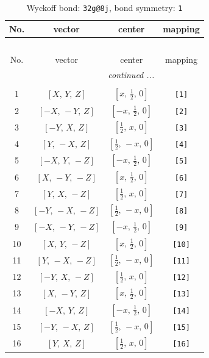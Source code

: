 \documentclass[fleqn,8pt]{jsarticle}
\begin{document}
\begin{longtable}{cccc}
\caption{Wyckoff bond: {\tt 32g@8j}, bond symmetry: {\tt 1}}
 \\
 \hline \hline
No. & vector & center & mapping \\ \hline \endfirsthead

\multicolumn{3}{l}{\tablename\ \thetable{}} \\
 \hline \hline
No. & vector & center & mapping \\ \hline \endhead

 \hline \hline
\multicolumn{3}{r}{\footnotesize\it continued ...} \\ \endfoot

 \hline \hline
\multicolumn{3}{r}{} \\ \endlastfoot

1 & $\left[ X,\, Y,\, Z \right]$ & $\left[ x,\, \frac{1}{2},\, 0 \right]$ & {\tt [1]} \\ \hline
2 & $\left[ - X,\, - Y,\, Z \right]$ & $\left[ - x,\, \frac{1}{2},\, 0 \right]$ & {\tt [2]} \\ \hline
3 & $\left[ - Y,\, X,\, Z \right]$ & $\left[ \frac{1}{2},\, x,\, 0 \right]$ & {\tt [3]} \\ \hline
4 & $\left[ Y,\, - X,\, Z \right]$ & $\left[ \frac{1}{2},\, - x,\, 0 \right]$ & {\tt [4]} \\ \hline
5 & $\left[ - X,\, Y,\, - Z \right]$ & $\left[ - x,\, \frac{1}{2},\, 0 \right]$ & {\tt [5]} \\ \hline
6 & $\left[ X,\, - Y,\, - Z \right]$ & $\left[ x,\, \frac{1}{2},\, 0 \right]$ & {\tt [6]} \\ \hline
7 & $\left[ Y,\, X,\, - Z \right]$ & $\left[ \frac{1}{2},\, x,\, 0 \right]$ & {\tt [7]} \\ \hline
8 & $\left[ - Y,\, - X,\, - Z \right]$ & $\left[ \frac{1}{2},\, - x,\, 0 \right]$ & {\tt [8]} \\ \hline
9 & $\left[ - X,\, - Y,\, - Z \right]$ & $\left[ - x,\, \frac{1}{2},\, 0 \right]$ & {\tt [9]} \\ \hline
10 & $\left[ X,\, Y,\, - Z \right]$ & $\left[ x,\, \frac{1}{2},\, 0 \right]$ & {\tt [10]} \\ \hline
11 & $\left[ Y,\, - X,\, - Z \right]$ & $\left[ \frac{1}{2},\, - x,\, 0 \right]$ & {\tt [11]} \\ \hline
12 & $\left[ - Y,\, X,\, - Z \right]$ & $\left[ \frac{1}{2},\, x,\, 0 \right]$ & {\tt [12]} \\ \hline
13 & $\left[ X,\, - Y,\, Z \right]$ & $\left[ x,\, \frac{1}{2},\, 0 \right]$ & {\tt [13]} \\ \hline
14 & $\left[ - X,\, Y,\, Z \right]$ & $\left[ - x,\, \frac{1}{2},\, 0 \right]$ & {\tt [14]} \\ \hline
15 & $\left[ - Y,\, - X,\, Z \right]$ & $\left[ \frac{1}{2},\, - x,\, 0 \right]$ & {\tt [15]} \\ \hline
16 & $\left[ Y,\, X,\, Z \right]$ & $\left[ \frac{1}{2},\, x,\, 0 \right]$ & {\tt [16]} \\
\end{longtable}
\end{document}
